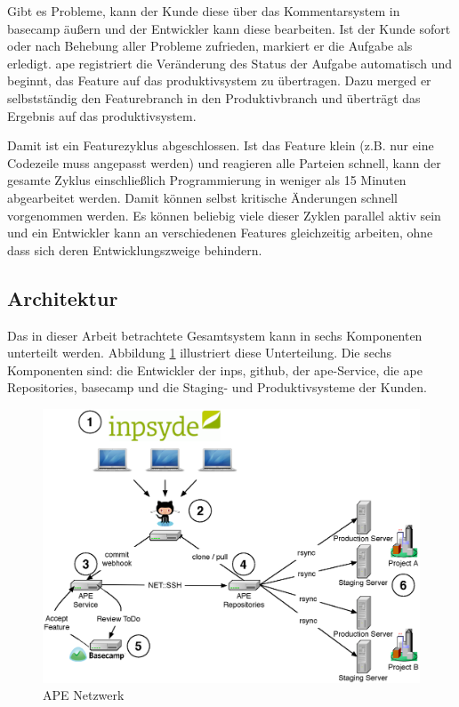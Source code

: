 Gibt es Probleme, kann der Kunde diese über das Kommentarsystem in \gls{basecamp} äußern und der Entwickler kann diese bearbeiten. Ist der Kunde sofort oder nach Behebung aller Probleme zufrieden, markiert er die Aufgabe als erledigt. \gls{ape} registriert die Veränderung des Status der Aufgabe automatisch und beginnt, das Feature auf das \gls{produktivsystem} zu übertragen. Dazu merged er selbstständig den Featurebranch in den Produktivbranch und überträgt das Ergebnis auf das \gls{produktivsystem}.

Damit ist ein Featurezyklus abgeschlossen. Ist das Feature klein (z.B. nur eine Codezeile muss angepasst werden) und reagieren alle Parteien schnell, kann der gesamte Zyklus einschließlich Programmierung in weniger als 15 Minuten abgearbeitet werden. Damit können selbst kritische Änderungen schnell vorgenommen werden. Es können beliebig viele dieser Zyklen parallel aktiv sein und ein Entwickler kann an verschiedenen Features gleichzeitig arbeiten, ohne dass sich deren Entwicklungszweige behindern.


\subsection{Architektur} %
\label{sub:architektur}

Das in dieser Arbeit betrachtete Gesamtsystem kann in sechs Komponenten unterteilt werden. Abbildung \ref{fig:ape_network} illustriert diese Unterteilung. Die sechs Komponenten sind:  die Entwickler der \gls{inps},  \gls{github},  der \gls{ape}-Service,  die \gls{ape} Repositories,  \gls{basecamp} und  die Staging- und Produktivsysteme der Kunden.

\begin{figure}
	\includegraphics[width=1.0\textwidth]{assets/ape_network.eps}
	\caption{APE Netzwerk}
	\label{fig:ape_network}
\end{figure}

